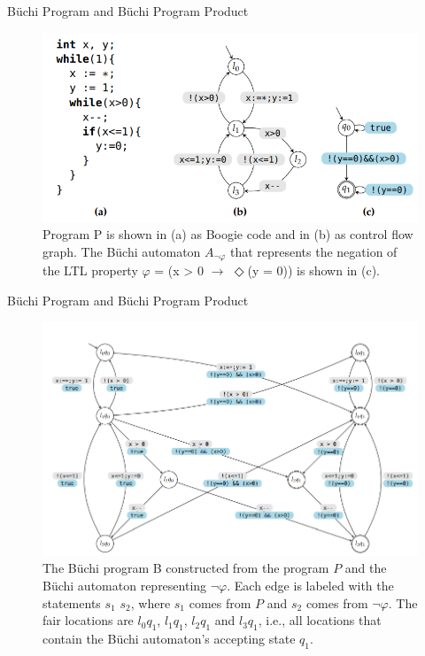 \documentclass[12pt]{beamer}
\begin{document}
\captionsetup[figure]{font=scriptsize ,labelfont=scriptsize}
\begin{frame}{B\"uchi Program and B\"uchi Program Product}
    \begin{figure}
        \centering
        \includegraphics[scale=0.35]{program_and_spec.png}
        \caption{Program P is shown in (a) as Boogie code and in (b) as control flow graph. The B\"uchi automaton $A_{\neg\varphi}$ that represents the negation of the LTL property $\varphi$ = (x > 0 $\rightarrow$ $\Diamond$(y = 0)) is shown in (c).}
    \end{figure}    
\end{frame}

\captionsetup[figure]{font=scriptsize ,labelfont=scriptsize}
\begin{frame}{B\"uchi Program and B\"uchi Program Product}
    \begin{figure}
        \centering
        \includegraphics[scale=0.35]{Buchiprogram.png}
        \caption{The B\"uchi program B constructed from the program $P$ and the B\"uchi automaton representing $\neg\varphi$. Each edge is labeled with the statements $s_{1}$ $s_{2}$, where $s_{1}$ comes from $P$ and $s_{2}$ comes from $\neg\varphi$. The fair locations are $l_{0}q_{1}$, $l_{1}q_{1}$, $l_{2}q_{1}$ and $l_{3}q_{1}$, i.e., all locations that contain the B\"uchi automaton’s accepting state $q_{1}$.}
    \end{figure}    
\end{frame}
\end{document}
